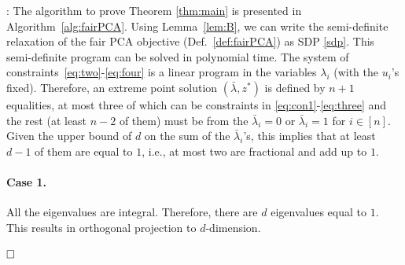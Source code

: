 \documentclass{article}
\newenvironment{proofof}[1]{\smallskip\noindent{\bf Proof of #1}:}{$\hfill \Box$\\}
\begin{document}
\begin{proofof}{Theorem~\ref{thm:main}}
The algorithm to prove Theorem  \ref{thm:main} is presented in Algorithm~\ref{alg:fairPCA}. Using Lemma~\ref{lem:B}, we can write the semi-definite relaxation of the fair PCA objective (Def.~\ref{def:fairPCA}) as SDP \eqref{sdp}. This semi-definite program can be solved in polynomial time.
The system of constraints~\eqref{eq:two}-\eqref{eq:four} is a linear program in the variables $\lambda_i$ (with the $u_i$'s fixed). Therefore, an extreme point solution \((\bar{\lambda},z^*)\) is defined by $n+1$ equalities, at most  three of which can be constraints in \eqref{eq:con1}-\eqref{eq:three} and the rest (at least $n-2$ of them) must be from the $\bar{\lambda}_i = 0$ or $\bar{\lambda}_i = 1$ for $i\in[n]$. Given the upper bound of $d$ on the sum of the $\bar{\lambda}_i$'s, this implies that at least $d-1$ of them are equal to $1$, i.e., at most two are fractional and add up to $1$.
\vspace{-3 mm}
\paragraph{Case 1.} All the eigenvalues are integral. Therefore, there are
  $d$ eigenvalues equal to $1$. This results in orthogonal projection
  to $d$-dimension.

\end{proofof}
\end{document}
